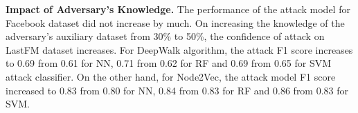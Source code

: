 \textbf{Impact of Adversary's Knowledge.} The performance of the attack model for Facebook dataset did not increase by much.
On increasing the knowledge of the adversary's auxiliary dataset from 30\% to 50\%, the confidence of attack on LastFM dataset increases.
For DeepWalk algorithm, the attack F1 score increases to 0.69 from 0.61 for NN, 0.71 from 0.62 for RF and 0.69 from 0.65 for SVM attack classifier.
On the other hand, for Node2Vec, the attack model F1 score increased to 0.83 from 0.80 for NN, 0.84 from 0.83 for RF and 0.86 from 0.83 for SVM.
